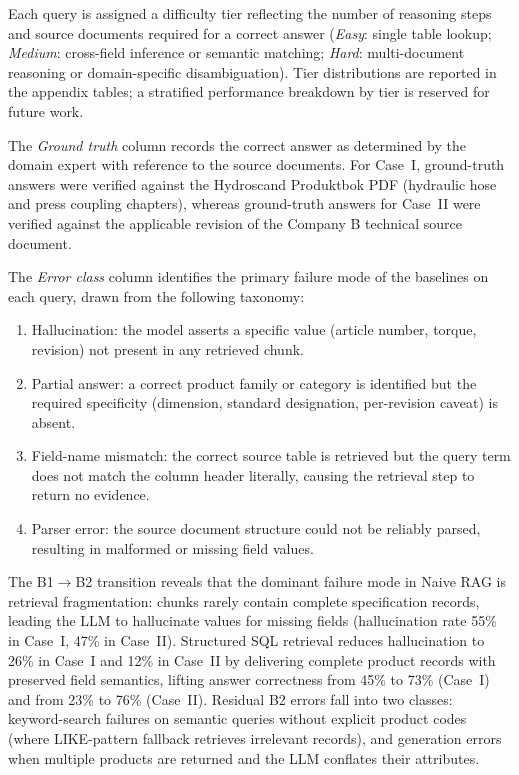 \documentclass[largeformat]{interact}
\begin{document}
Each query is assigned a difficulty tier reflecting the number of reasoning steps and source documents required for a correct answer (\emph{Easy}: single table lookup; \emph{Medium}: cross-field inference or semantic matching; \emph{Hard}: multi-document reasoning or domain-specific disambiguation). Tier distributions are reported in the appendix tables; a stratified performance breakdown by tier is reserved for future work.

The \emph{Ground truth} column records the correct answer as determined by the domain expert with reference to the source documents. For Case~I, ground-truth answers were verified against the Hydroscand Produktbok PDF (hydraulic hose and press coupling chapters), whereas ground-truth answers for Case~II were verified against the applicable revision of the Company B technical source document.

The \emph{Error class} column identifies the primary failure mode of the baselines on each query, drawn from the following taxonomy:
\begin{enumerate}[label=\roman*.]
    \item Hallucination: the model asserts a specific value (article number, torque, revision) not present in any retrieved chunk.
    \item Partial answer: a correct product family or category is identified but the required specificity (dimension, standard designation, per-revision caveat) is absent.
    \item Field-name mismatch: the correct source table is retrieved but the query term does not match the column header literally, causing the retrieval step to return no evidence.
    \item Parser error: the source document structure could not be reliably parsed, resulting in malformed or missing field values.
\end{enumerate}

The B1$\rightarrow$B2 transition reveals that the dominant failure mode in Naive RAG is retrieval fragmentation: chunks rarely contain complete specification records, leading the LLM to hallucinate values for missing fields (hallucination rate 55\% in Case~I, 47\% in Case~II). Structured SQL retrieval reduces hallucination to 26\% in Case~I and 12\% in Case~II by delivering complete product records with preserved field semantics, lifting answer correctness from 45\% to 73\% (Case~I) and from 23\% to 76\% (Case~II). Residual B2 errors fall into two classes: keyword-search failures on semantic queries without explicit product codes (where LIKE-pattern fallback retrieves irrelevant records), and generation errors when multiple products are returned and the LLM conflates their attributes.
\end{document}
